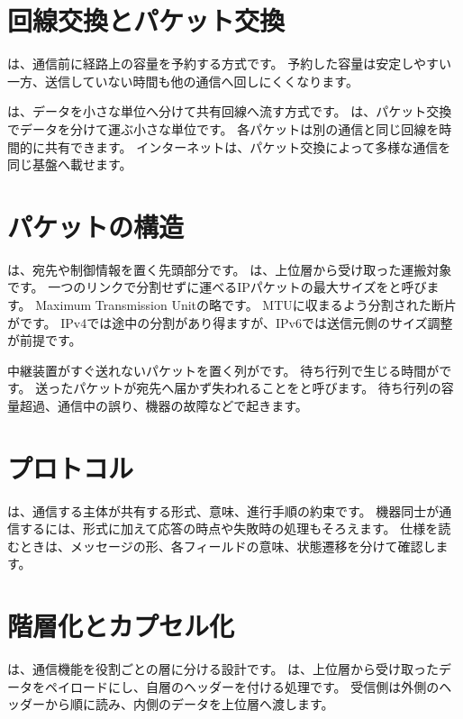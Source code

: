 \section{回線交換とパケット交換}

は、通信前に経路上の容量を予約する方式です。
予約した容量は安定しやすい一方、送信していない時間も他の通信へ回しにくくなります。

は、データを小さな単位へ分けて共有回線へ流す方式です。
は、パケット交換でデータを分けて運ぶ小さな単位です。
各パケットは別の通信と同じ回線を時間的に共有できます。
インターネットは、パケット交換によって多様な通信を同じ基盤へ載せます。

\section{パケットの構造}

は、宛先や制御情報を置く先頭部分です。
は、上位層から受け取った運搬対象です。
一つのリンクで分割せずに運べるIPパケットの最大サイズをと呼びます。
Maximum Transmission Unitの略です。
MTUに収まるよう分割された断片がです。
IPv4では途中の分割があり得ますが、IPv6では送信元側のサイズ調整が前提です。

中継装置がすぐ送れないパケットを置く列がです。
待ち行列で生じる時間がです。
送ったパケットが宛先へ届かず失われることをと呼びます。
待ち行列の容量超過、通信中の誤り、機器の故障などで起きます。

\section{プロトコル}

は、通信する主体が共有する形式、意味、進行手順の約束です。
機器同士が通信するには、形式に加えて応答の時点や失敗時の処理もそろえます。
仕様を読むときは、メッセージの形、各フィールドの意味、状態遷移を分けて確認します。

\section{階層化とカプセル化}

は、通信機能を役割ごとの層に分ける設計です。
は、上位層から受け取ったデータをペイロードにし、自層のヘッダーを付ける処理です。
受信側は外側のヘッダーから順に読み、内側のデータを上位層へ渡します。

